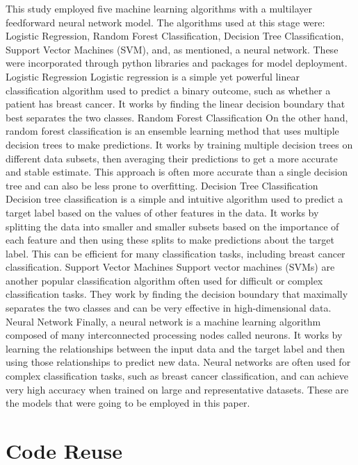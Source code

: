 \documentclass[10pt,twocolumn,letterpaper]{article}
\begin{document}
This study employed five machine learning algorithms with a multilayer feedforward neural network model. The algorithms used at this stage were: Logistic Regression, Random Forest Classification, Decision Tree Classification, Support Vector Machines (SVM), and, as mentioned, a neural network. These were incorporated through python libraries and packages for model deployment.
Logistic Regression
Logistic regression is a simple yet powerful linear classification algorithm used to predict a binary outcome, such as whether a patient has breast cancer. It works by finding the linear decision boundary that best separates the two classes. 
Random Forest Classification
On the other hand, random forest classification is an ensemble learning method that uses multiple decision trees to make predictions. It works by training multiple decision trees on different data subsets, then averaging their predictions to get a more accurate and stable estimate. This approach is often more accurate than a single decision tree and can also be less prone to overfitting.
Decision Tree Classification
Decision tree classification is a simple and intuitive algorithm used to predict a target label based on the values of other features in the data. It works by splitting the data into smaller and smaller subsets based on the importance of each feature and then using these splits to make predictions about the target label. This can be efficient for many classification tasks, including breast cancer classification. 
Support Vector Machines
Support vector machines (SVMs) are another popular classification algorithm often used for difficult or complex classification tasks. They work by finding the decision boundary that maximally separates the two classes and can be very effective in high-dimensional data. 
Neural Network
Finally, a neural network is a machine learning algorithm composed of many interconnected processing nodes called neurons. It works by learning the relationships between the input data and the target label and then using those relationships to predict new data. Neural networks are often used for complex classification tasks, such as breast cancer classification, and can achieve very high accuracy when trained on large and representative datasets. 
These are the models that were going to be employed in this paper.

\section{Code Reuse}
\label{sec:Incorporated Code}
\end{document}
